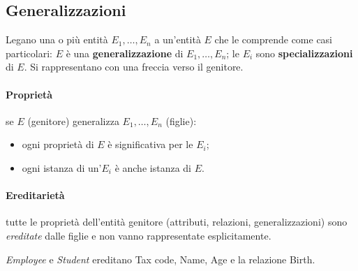 \documentclass[a4paper,12pt]{article}
\begin{document}
\subsection{Generalizzazioni}

Legano una o più entità $E_1, \dots, E_n$ a un'entità $E$ che le comprende
come casi particolari: $E$ è una \textbf{generalizzazione} di $E_1, \dots,
E_n$; le $E_i$ sono \textbf{specializzazioni} di $E$. Si rappresentano con una
freccia verso il genitore.

\paragraph{Proprietà} se $E$ (genitore) generalizza $E_1, \dots, E_n$ (figlie):
\begin{itemize}
  \item ogni proprietà di $E$ è significativa per le $E_i$;
  \item ogni istanza di un'$E_i$ è anche istanza di $E$.
\end{itemize}

\paragraph{Ereditarietà} tutte le proprietà dell'entità genitore (attributi,
relazioni, generalizzazioni) sono \emph{ereditate} dalle figlie e non vanno
rappresentate esplicitamente.
\begin{center}
\end{center}
\emph{Employee} e \emph{Student} ereditano Tax code, Name, Age e la relazione
Birth.
\end{document}
